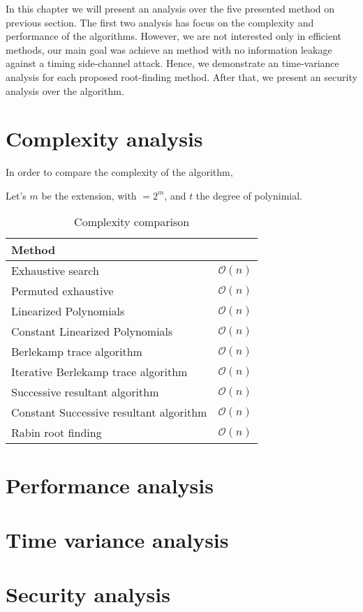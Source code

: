 In this chapter we will present an analysis over the five presented method on previous section. The first two analysis has focus on the complexity and performance of the algorithms. However, we are not interested only in efficient methods, our main goal was achieve an method with no information leakage against a timing side-channel attack. Hence, we demonstrate an time-variance analysis for each proposed root-finding method. After that, we present an security analysis over the algorithm.

\section{Complexity analysis}
In order to compare the complexity of the algorithm, 

Let's $m$ be the extension, with $ = 2^m$, and $t$ the degree of polynimial.


\begin{table}[ht]
\centering
\label{tab:complexity}
\caption{Complexity comparison}
\begin{tabular}{ll}
Method                                  &                \\ \hline
Exhaustive search                       & $\mathcal{O}(n)$ \\
Permuted exhaustive                     & $\mathcal{O}(n)$ \\
Linearized Polynomials                  & $\mathcal{O}(n)$ \\
Constant Linearized Polynomials         & $\mathcal{O}(n)$ \\
Berlekamp trace algorithm               & $\mathcal{O}(n)$ \\
Iterative Berlekamp trace algorithm     & $\mathcal{O}(n)$ \\
Successive resultant algorithm          & $\mathcal{O}(n)$ \\
Constant Successive resultant algorithm & $\mathcal{O}(n)$ \\
Rabin root finding                      & $\mathcal{O}(n)$
\end{tabular}
\end{table}



\section{Performance analysis}
\section{Time variance analysis}
\section{Security analysis}